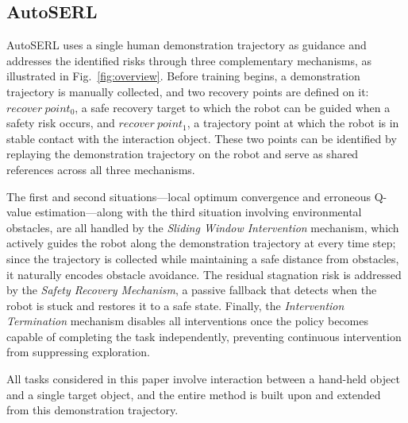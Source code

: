 \documentclass[runningheads]{llncs}
\begin{document}
\subsection{AutoSERL}
AutoSERL uses a single human demonstration trajectory as guidance and addresses 
the identified risks through three complementary mechanisms, as illustrated in 
Fig.~\ref{fig:overview}. Before training begins, a demonstration trajectory 
is manually collected, and two recovery points are defined on it: 
$recover\ point_0$, a safe recovery target to which the robot can be guided 
when a safety risk occurs, and $recover\ point_1$, a trajectory point at which 
the robot is in stable contact with the interaction object. These two points 
can be identified by replaying the demonstration trajectory on the robot and 
serve as shared references across all three mechanisms.

The first and second situations—local optimum convergence and erroneous 
Q-value estimation—along with the third situation involving environmental 
obstacles, are all handled by the \textit{Sliding Window Intervention} 
mechanism, which actively guides the robot along the demonstration trajectory 
at every time step; since the trajectory is collected while maintaining a safe 
distance from obstacles, it naturally encodes obstacle avoidance. The residual 
stagnation risk is addressed by the \textit{Safety Recovery Mechanism}, a 
passive fallback that detects when the robot is stuck and restores it to a safe 
state. Finally, the \textit{Intervention Termination} mechanism disables all 
interventions once the policy becomes capable of completing the task 
independently, preventing continuous intervention from suppressing exploration.

All tasks considered in this paper involve interaction between a hand-held 
object and a single target object, and the entire method is built upon and 
extended from this demonstration trajectory.
\end{document}
